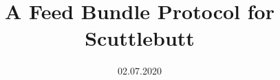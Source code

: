 \documentclass[a4paper, 10pt, oneside]{memoir}
\title				{A Feed Bundle Protocol for Scuttlebutt}
\date				{02.07.2020}
\begin{document}

\thesisfront
\maketitle
\pagestyle{thesis}


\thesistoc
\thesismain







%
%


%
%
%
%
\thesisappendix
\thesisbib
\begin{appendices}
\end{appendices}
\thesisback

\end{document}
